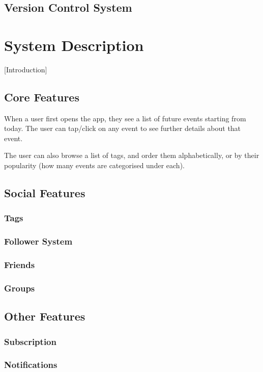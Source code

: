 \documentclass[11pt]{article}
\begin{document}
\subsection {Version Control System}

\section {System Description}

[Introduction]

\subsection {Core Features}

When a user first opens the app, they see a list of future events starting from today. The user can tap/click on any event to see further details about that event.

The user can also browse a list of tags, and order them alphabetically, or by their popularity (how many events are categorised under each).

\subsection {Social Features}
\subsubsection {Tags}
\subsubsection {Follower System}
\subsubsection {Friends}
\subsubsection {Groups}
\subsection {Other Features}
\subsubsection {Subscription}
\subsubsection {Notifications}
\end{document}
